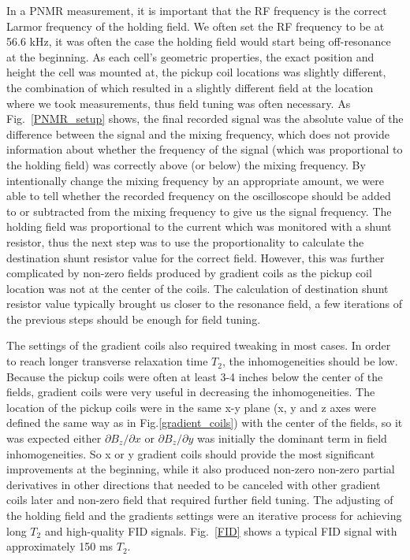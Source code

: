 In a PNMR measurement, it is important that the RF frequency is the correct Larmor frequency of the holding field. We often set the RF frequency to be at 56.6 kHz, it was often the case the holding field would start being off-resonance at the beginning. As each cell's geometric properties, the exact position and height the cell was mounted at, the pickup coil locations was slightly different, the combination of which resulted in a slightly different field at the location where we took measurements, thus field tuning was often necessary. As Fig.~\ref{PNMR_setup} shows, the final recorded signal was the absolute value of the difference between the signal and the mixing frequency, which does not provide information about whether the frequency of the signal (which was proportional to the holding field) was correctly above (or below) the mixing frequency. By intentionally change the mixing frequency by an appropriate amount, we were able to tell whether the recorded frequency on the oscilloscope should be added to or subtracted from the mixing frequency to give us the signal frequency. The holding field was proportional to the current which was monitored with a shunt resistor, thus the next step was to use the proportionality to calculate the destination shunt resistor value for the correct field. However, this was further complicated by non-zero fields produced by gradient coils as the pickup coil location was not at the center of the coils. The calculation of destination shunt resistor value typically brought us closer to the resonance field, a few iterations of the previous steps should be enough for field tuning.

The settings of the gradient coils also required tweaking in most cases. In order to reach longer transverse relaxation time $T_2$, the inhomogeneities should be low. Because the pickup coils were often at least 3-4 inches below the center of the fields, gradient coils were very useful in decreasing the inhomogeneities. The location of the pickup coils were in the same x-y plane (x, y and z axes were defined the same way as in Fig.\ref{gradient_coils}) with the center of the fields, so it was expected either $\partial B_z/\partial x$ or $\partial B_z/\partial y$ was initially the dominant term in field inhomogeneities. So x or y gradient coils should provide the most significant improvements at the beginning, while it also produced non-zero non-zero partial derivatives in other directions that needed to be canceled with other gradient coils later and non-zero field that required further field tuning. The adjusting of the holding field and the gradients settings were an iterative process for achieving long $T_2$ and high-quality FID signals. Fig.~\ref{FID} shows a typical FID signal with approximately 150 ms $T_2$.

